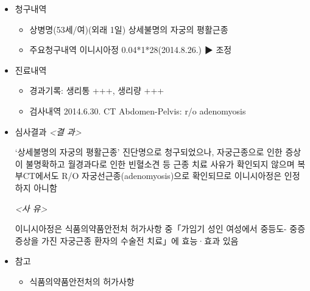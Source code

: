 \begin{itemize}[■]\tightlist
\item 청구내역
	\begin{itemize}[○]\tightlist
	\item 상병명(53세/여)(외래 1일)
    상세불명의 자궁의 평활근종 
	\item 주요청구내역
    이니시아정 0.04*1*28(2014.8.26.) ▶ 조정  
	\end{itemize}

\item 진료내역
	\begin{itemize}[○]\tightlist
	\item 경과기록: 생리통 +++, 생리량 +++
	\item 검사내역 
    2014.6.30. CT Abdomen-Pelvis: r/o adenomyosis 
	\end{itemize}
\item 심사결과
 \emph{<결  과> }\par
‘상세불명의 자궁의 평활근종’ 진단명으로 청구되었으나, 자궁근종으로 인한 
  증상이 불명확하고  월경과다로 인한 빈혈소견 등 근종 치료 사유가 확인되지 않으며 
  복부CT에서도 R/O 자궁선근종(adenomyosis)으로 확인되므로 이니시아정은 인정  
  하지 아니함

 \emph{<사  유> } \par
 이니시아정은 식품의약품안전처 허가사항 중「가임기 성인 여성에서 중등도-
 중증 증상을 가진 자궁근종 환자의 수술전 치료」에 효능·효과 있음 

\item 참고
	\begin{itemize}[○]\tightlist
	\item  식품의약품안전처의 허가사항 
	\end{itemize}
\end{itemize} 
 
